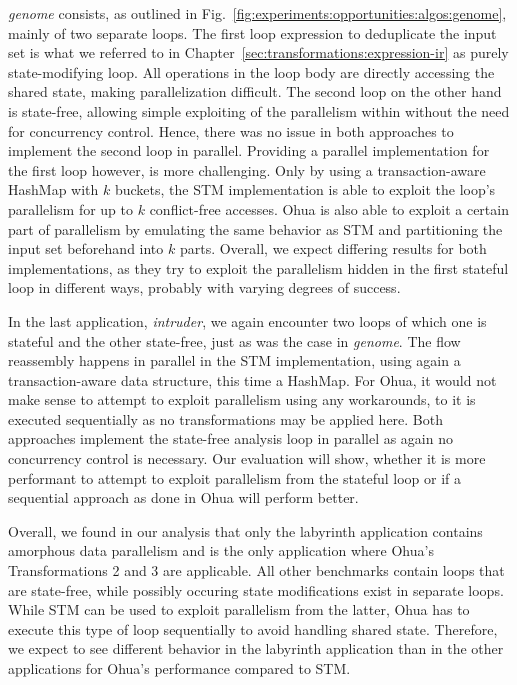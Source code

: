 \emph{genome} consists, as outlined in Fig.~\ref{fig:experiments:opportunities:algos:genome}, mainly of two separate loops.
The first loop expression to deduplicate the input set is what we referred to in Chapter~\ref{sec:transformations:expression-ir} as purely state-modifying loop.
All operations in the loop body are directly accessing the shared state, making parallelization difficult.
The second loop on the other hand is state-free, allowing simple exploiting of the parallelism within without the need for concurrency control.
Hence, there was no issue in both approaches to implement the second loop in parallel.
Providing a parallel implementation for the first loop however, is more challenging.
Only by using a transaction-aware HashMap with $k$ buckets, the STM implementation is able to exploit the loop's parallelism for up to $k$ conflict-free accesses.
Ohua is also able to exploit a certain part of parallelism by emulating the same behavior as STM and partitioning the input set beforehand into $k$ parts.
Overall, we expect differing results for both implementations, as they try to exploit the parallelism hidden in the first stateful loop in different ways, probably with varying degrees of success.

In the last application, \emph{intruder}, we again encounter two loops of which one is stateful and the other state-free, just as was the case in \emph{genome}.
The flow reassembly happens in parallel in the STM implementation, using again a transaction-aware data structure, this time a HashMap.
For Ohua, it would not make sense to attempt to exploit parallelism using any workarounds, to it is executed sequentially as no transformations may be applied here.
Both approaches implement the state-free analysis loop in parallel as again no concurrency control is necessary.
Our evaluation will show, whether it is more performant to attempt to exploit parallelism from the stateful loop or if a sequential approach as done in Ohua will perform better.

Overall, we found in our analysis that only the labyrinth application contains amorphous data parallelism and is the only application where Ohua's Transformations 2 and 3 are applicable.
All other benchmarks contain loops that are state-free, while possibly occuring state modifications exist in separate loops.
While STM can be used to exploit parallelism from the latter, Ohua has to execute this type of loop sequentially to avoid handling shared state.
Therefore, we expect to see different behavior in the labyrinth application than in the other applications for Ohua's performance compared to STM.


